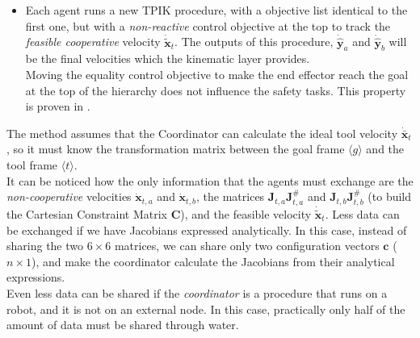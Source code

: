 \begin{itemize}
	\item Each agent runs a new TPIK procedure, with a objective list identical to the first one, but with a \textit{non-reactive} control objective at the top to track the \textit{feasible cooperative} velocity $\dot{\tilde{\boldsymbol{x}}}_t$. The outputs of this procedure, $\dot{\hat{\boldsymbol{y}}}_a$ and $\dot{\hat{\boldsymbol{y}}}_b$ will be the final velocities which the kinematic layer provides.\\
	Moving the equality control objective to make the end effector reach the goal at the top of the hierarchy does not influence the safety tasks. This property is proven in \cite{tesiWander}.
\end{itemize}
\vspace{15px}
The method assumes that the Coordinator can calculate the ideal tool velocity $\dot{\bar{\boldsymbol{x}}}_t$, so it must know the transformation matrix between the goal frame $\langle g \rangle $ and the tool frame $ \langle t \rangle $.\\

It can be noticed how the only information that the agents must exchange are the 
\textit{non-cooperative} velocities $\dot{\boldsymbol{x}}_{t,a}$ and $\dot{\boldsymbol{x}}_{t,b}$, the matrices $\boldsymbol{J}_{t,a} \boldsymbol{J}^{\#}_{t,a}$ and $\boldsymbol{J}_{t,b} \boldsymbol{J}^{\#}_{t,b}$ (to build the Cartesian Constraint Matrix $\boldsymbol{C}$), and the feasible velocity $\dot{\tilde{\boldsymbol{x}}}_t$. Less data can be exchanged if we have Jacobians expressed analytically. In this case, instead of sharing the two $6 \times 6$ matrices, we can share only two configuration vectors $\boldsymbol{c}$ ($n \times 1$), and make the coordinator calculate the Jacobians from their analytical expressions.\\
Even less data can be shared if the \textit{coordinator} is a procedure that runs on a robot, and it is not on an external node. In this case, practically only half of the amount of data must be shared through water.